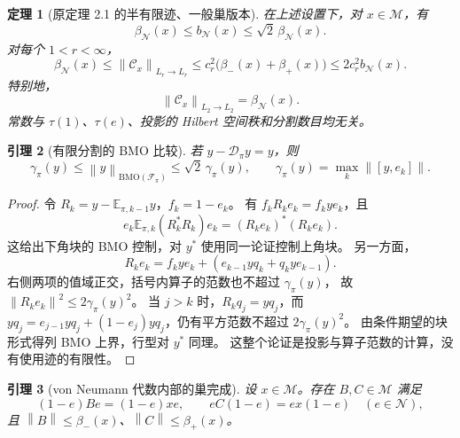 \documentclass[UTF8,11pt,a4paper,fontset=fandol]{ctexart}
\newtheorem{theorem}{定理}[section]
\newtheorem{lemma}[theorem]{引理}
\theoremstyle{remark}
\numberwithin{equation}{section}
\newcommand{\M}{\mathcal M}
\newcommand{\N}{\mathcal N}
\newcommand{\D}{\mathcal D}
\newcommand{\CC}{\mathcal C}
\newcommand{\E}{\mathbb E}
\newcommand{\norm}[1]{\left\lVert #1\right\rVert}
\begin{document}
\begin{theorem}[原定理 2.1 的半有限迹、一般巢版本]\label{thm:bounded}
在上述设置下，对 $x\in\M$，有
\begin{equation}\label{eq:bmo-beta}
 \boxed{\quad \beta_\N(x)\leq b_\N(x)\leq\sqrt2\,\beta_\N(x).\quad}
\end{equation}
对每个 $1<r<\infty$，
\begin{equation}\label{eq:bound}
 \boxed{\quad
 \beta_\N(x)\leq\norm{\CC_x}_{L_r\to L_r}
 \leq c_r^2\bigl(\beta_-(x)+\beta_+(x)\bigr)
 \leq2c_r^2 b_\N(x).
 \quad}
\end{equation}
特别地，
\begin{equation}\label{eq:exact2}
 \norm{\CC_x}_{L_2\to L_2}=\beta_\N(x).
\end{equation}
常数与 $\tau(1)$、$\tau(e)$、投影的 Hilbert 空间秩和分割数目均无关。
\end{theorem}

\begin{lemma}[有限分割的 BMO 比较]\label{lem:bmo}
若 $y-\D_\pi y=y$，则
\[
 \gamma_\pi(y)\leq\norm y_{\mathrm{BMO}(\mathcal F_\pi)}
 \leq\sqrt2\,\gamma_\pi(y),
 \qquad
 \gamma_\pi(y)=\max_k\norm{[y,e_k]}.
\]
\end{lemma}

\begin{proof}
令 $R_k=y-\E_{\pi,k-1}y$，$f_k=1-e_k$。
有 $f_kR_ke_k=f_kye_k$，且
\[
 e_k\E_{\pi,k}(R_k^*R_k)e_k=(R_ke_k)^*(R_ke_k).
\]
这给出下角块的 BMO 控制，对 $y^*$ 使用同一论证控制上角块。
另一方面，
\[
 R_ke_k=f_kye_k+(e_{k-1}yq_k+q_kye_{k-1}).
\]
右侧两项的值域正交，括号内算子的范数也不超过 $\gamma_\pi(y)$，
故 $\norm{R_ke_k}^2\leq2\gamma_\pi(y)^2$。
当 $j>k$ 时，$R_kq_j=yq_j$，而
$yq_j=e_{j-1}yq_j+(1-e_j)yq_j$，仍有平方范数不超过 $2\gamma_\pi(y)^2$。
由条件期望的块形式得列 BMO 上界，行型对 $y^*$ 同理。
这整个论证是投影与算子范数的计算，没有使用迹的有限性。
\end{proof}

\begin{lemma}[von Neumann 代数内部的巢完成]\label{lem:completion}
设 $x\in\M$。存在 $B,C\in\M$ 满足
\[
 (1-e)Be=(1-e)xe,\qquad eC(1-e)=ex(1-e)\quad(e\in\N),
\]
且 $\norm B\leq\beta_-(x)$、$\norm C\leq\beta_+(x)$。
\end{lemma}
\end{document}
